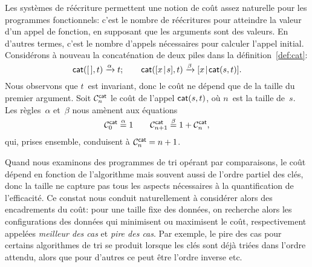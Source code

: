 
Les systèmes de réécriture permettent une notion de coût assez
naturelle pour les programmes fonctionnels: c'est le nombre de
réécritures pour atteindre la valeur d'un appel de fonction, en
supposant que les arguments sont des valeurs. En d'autres termes,
c'est le nombre d'appels nécessaires pour calculer l'appel
initial. Considérons à nouveau la concaténation de deux piles dans la
définition~\eqref{def:cat}:
\begin{equation*}
\fun{cat}(        \el,t) \xrightarrow{\smash{\alpha}} t;\qquad
\fun{cat}(\cons{x}{s},t) \xrightarrow{\smash{\beta}}
\cons{x}{\fun{cat}(s,t)}.
\end{equation*}
Nous observons que \(t\)~est invariant, donc le coût ne dépend que de
la taille du premier argument. Soit
\(\C{\fun{cat}}{n}\) le coût de l'appel
\(\fun{cat}(s,t)\), où \(n\)~est la taille
de~\(s\). Les règles~\(\alpha\) et~\(\beta\) nous amènent aux
équations
\begin{equation*}
  \C{\fun{cat}}{0} \eqn{\smash{\alpha}} 1 \qquad
  \C{\fun{cat}}{n+1} \eqn{\smash{\beta}} 1 + \C{\fun{cat}}{n},
\end{equation*}
qui, prises ensemble, conduisent à \(\C{\fun{cat}}{n} = n + 1\).
\label{cost_cat}



Quand nous examinons des programmes de tri opérant par comparaisons,
le coût dépend en fonction de l'algorithme mais souvent aussi de
l'ordre partiel des clés, donc la taille ne capture pas tous les
aspects nécessaires à la quantification de l'efficacité. Ce constat
nous conduit naturellement à considérer alors des encadrements du
coût: pour une taille fixe des données, on recherche alors les
configurations des données qui minimisent ou maximisent le coût,
respectivement appelées \emph{meilleur des cas} et \emph{pire des
  cas}. Par exemple, le pire des cas pour certains algorithmes de tri
se produit lorsque les clés sont déjà triées dans l'ordre attendu,
alors que pour d'autres ce peut être l'ordre inverse etc.

\label{par:mean_sort}

